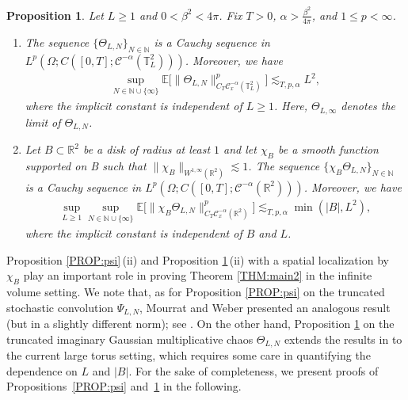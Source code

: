\documentclass[letterpaper, 11pt,  reqno]{amsart}
\newtheorem{proposition}[theorem]{Proposition}
\theoremstyle{myremark}
\newcommand{\Ta}{\Theta}
\newcommand{\1}{\hspace{0.5mm}\text{I}\hspace{0.5mm}}
\newcommand{\R}{\mathbb{R}}
\newcommand{\T}{\mathbb{T}}
\newcommand{\CC}{\mathcal{C}}
\newcommand{\E}{\mathbb{E}}
\newcommand{\al}{\alpha}
\newcommand{\be}{\beta}
\renewcommand{\O}{\Omega}
\newcommand{\les}{\lesssim}
\newcommand{\N}{\mathbb{N}}
\numberwithin{equation}{section}
\numberwithin{theorem}{section}
\begin{document}
 \begin{proposition}\label{PROP:igmc}
Let $L\ge 1$ and $0 < \be^2 < 4\pi$. Fix $T>0$, $\al > \frac{\be^2}{4\pi}$, and $1 \le p < \infty$. 
\begin{enumerate}
\item The sequence
$\{ \Theta_{L, N} \}_{N\in \N}$ is a Cauchy sequence  in $L^p(\O;C([0,T]; \CC^{-\al}(\T_L^2)))$.
Moreover, we have 
\begin{align}
\sup_{N \in \N\cup \{\infty\}}\E\Big[ \| \Theta_{L, N}\|_{C_T \CC_x^{-\al }(\T^2_L)}^p \Big] 
\les_{T, p, \al} L^{2},
\label{YY1}
\end{align}
where the implicit constant is independent of $L \ge 1$.
Here, $\Theta_{L, \infty}$ denotes the limit of $\Theta_{L, N}$.
\item Let $B \subset \R^2$ be a disk of radius at least $1$ and let $\chi_B$ be a smooth function supported on B such that $\|\chi_B\|_{W^{1,\infty}(\R^2)} \les 1$. The sequence
$ \{\chi_B \Theta_{L, N} \}_{N \in \N}$ is a Cauchy sequence in $L^p(\O;C([0,T]; \CC^{-\al}(\R^2)))$.
Moreover, we have 
\begin{align}
\sup_{L \ge 1} \sup_{N \in \N\cup\{\infty\}}  \E\Big[ \| \chi_B \Theta_{L, N}\|_{C_T \CC_x^{-\al}(\R^2)}^p \Big] 
\les_{T, p, \al} \min(|B|,L^2),
\label{YY2}
\end{align}
where the implicit constant is independent of $B$ and $L$.
\end{enumerate}
\end{proposition}





Proposition \ref{PROP:psi}\,(ii)
and Proposition \ref{PROP:igmc}\,(ii)
with a spatial localization by $\chi_B$
play an important role
in proving Theorem \ref{THM:main2}
in the infinite volume setting.
We note that, 
as for Proposition \ref{PROP:psi}
on 
the truncated stochastic convolution $\Psi_{L,N}$, 
Mourrat and Weber presented an analogous result 
(but in a slightly different norm);
see \cite[Theorem 5.1]{MW2}.
On the other hand, 
 Proposition \ref{PROP:igmc} 
on the  truncated  imaginary Gaussian multiplicative chaos
$\Ta_{L, N}$
 extends 
 the results in 
 \cite{HS, ORSW} to the current large torus setting,
 which requires some care
 in quantifying the dependence on $L$ and $|B|$.
For the sake of completeness, 
 we present proofs of Propositions~\ref{PROP:psi} and~\ref{PROP:igmc}
 in the following. 

\end{document}
